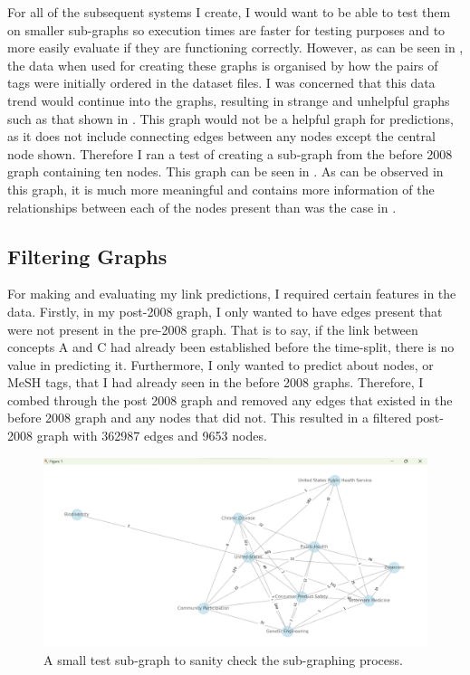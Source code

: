\documentclass{l4proj}
\begin{document}
For all of the subsequent systems I create, I would want to be able to test them on smaller sub-graphs so execution times are faster for testing purposes and to more easily evaluate if they are functioning correctly. However, as can be seen in , the data when used for creating these graphs is organised by how the pairs of tags were initially ordered in the dataset files. I was concerned that this data trend would continue into the graphs, resulting in strange and unhelpful graphs such as that shown in . This graph would not be a helpful graph for predictions, as it does not include connecting edges between any nodes except the central node shown. Therefore I ran a test of creating a sub-graph from the before 2008 graph containing ten nodes. This graph can be seen in . As can be observed in this graph, it is much more meaningful and contains more information of the relationships between each of the nodes present than was the case in . \\

\subsection{Filtering Graphs}

For making and evaluating my link predictions, I required certain features in the data. Firstly, in my post-2008 graph, I only wanted to have edges present that were not present in the pre-2008 graph. That is to say, if the link between concepts A and C had already been established before the time-split, there is no value in predicting it. Furthermore, I only wanted to predict about nodes, or MeSH tags, that I had already seen in the before 2008 graphs. Therefore, I combed through the post 2008 graph and removed any edges that existed in the before 2008 graph and any nodes that did not. This resulted in a filtered post-2008 graph with 362987 edges and 9653 nodes. \\

\begin{figure}[h]
    \centering
    \includegraphics[width=\linewidth]{images/test_subgraph.png}
    \caption{A small test sub-graph to sanity check the sub-graphing process.}
    \label{fig:test_subgraph}
\end{figure}
\end{document}
